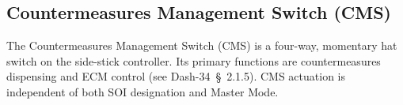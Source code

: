 \documentclass[11pt, a4paper, twoside]{report}
\newcommand{\dashref}[1]{Dash-34~\S~#1}
\begin{document}
\subsection{Countermeasures Management Switch (CMS)}
\label{sec:C2-S3-S3}

The Countermeasures Management Switch (CMS) is a four-way, momentary hat switch on the side-stick controller. Its primary functions are countermeasures dispensing and ECM control (see \dashref{2.1.5}). CMS actuation is independent of both SOI designation and Master Mode.

\end{document}
